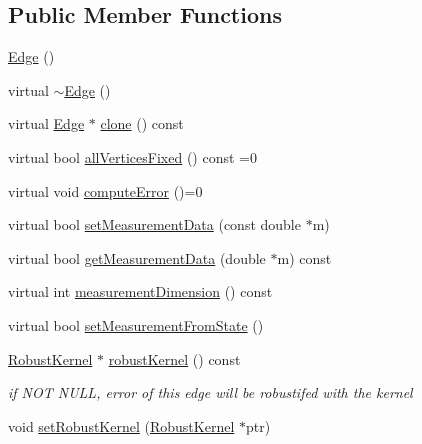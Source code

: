 \subsection*{Public Member Functions}
\begin{DoxyCompactItemize}
\item 
\mbox{\hyperlink{classg2o_1_1_optimizable_graph_1_1_edge_a6568eb7f3b3e4299473ec3230199aa70}{Edge}} ()
\item 
virtual \mbox{\hyperlink{classg2o_1_1_optimizable_graph_1_1_edge_a62de61a43d47cf223fe39265dac13ca5}{$\sim$\+Edge}} ()
\item 
virtual \mbox{\hyperlink{classg2o_1_1_optimizable_graph_1_1_edge}{Edge}} $\ast$ \mbox{\hyperlink{classg2o_1_1_optimizable_graph_1_1_edge_a1a238c63bc8a799ada3ac5712e13315e}{clone}} () const
\item 
virtual bool \mbox{\hyperlink{classg2o_1_1_optimizable_graph_1_1_edge_a414c69ca1617a4d3b620e39f2ffbcea7}{all\+Vertices\+Fixed}} () const =0
\item 
virtual void \mbox{\hyperlink{classg2o_1_1_optimizable_graph_1_1_edge_a1e6d9f4128866982de5e11e03edd7775}{compute\+Error}} ()=0
\item 
virtual bool \mbox{\hyperlink{classg2o_1_1_optimizable_graph_1_1_edge_ae8d99a85921057eba87a2346ba9c6e0a}{set\+Measurement\+Data}} (const double $\ast$m)
\item 
virtual bool \mbox{\hyperlink{classg2o_1_1_optimizable_graph_1_1_edge_abe22d8f67447fc93c49b5aa730eaba83}{get\+Measurement\+Data}} (double $\ast$m) const
\item 
virtual int \mbox{\hyperlink{classg2o_1_1_optimizable_graph_1_1_edge_a3441f5e149c30c50ce8557574ac7d1a8}{measurement\+Dimension}} () const
\item 
virtual bool \mbox{\hyperlink{classg2o_1_1_optimizable_graph_1_1_edge_a2f0b6465d6cd8b459ebc6494892c44f4}{set\+Measurement\+From\+State}} ()
\item 
\mbox{\hyperlink{classg2o_1_1_robust_kernel}{Robust\+Kernel}} $\ast$ \mbox{\hyperlink{classg2o_1_1_optimizable_graph_1_1_edge_a4fe9c69dc5275ca661e793aca6e2d93c}{robust\+Kernel}} () const
\begin{DoxyCompactList}\small\item\em if N\+OT N\+U\+LL, error of this edge will be robustifed with the kernel \end{DoxyCompactList}\item 
void \mbox{\hyperlink{classg2o_1_1_optimizable_graph_1_1_edge_a42955172c19f16e2cfbb30d611d1bd87}{set\+Robust\+Kernel}} (\mbox{\hyperlink{classg2o_1_1_robust_kernel}{Robust\+Kernel}} $\ast$ptr)

\end{DoxyCompactItemize}
